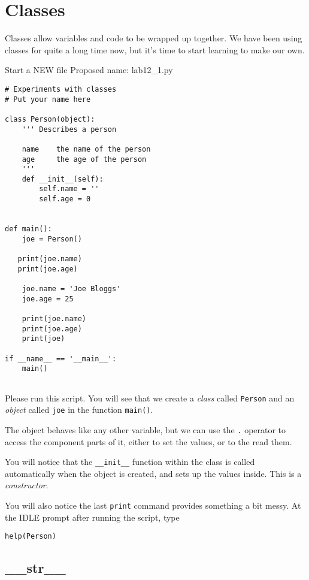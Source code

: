\documentclass[12pt,oneside]{cttutorial}
\begin{document}
\section{Classes}

Classes allow variables and code to be wrapped up together. We have been using classes for quite a long time now, but it's time to start learning to make our own.

\alert{Start a NEW file}
Proposed name: lab12\_1.py
\begin{lstlisting}
# Experiments with classes
# Put your name here

class Person(object):
    ''' Describes a person

    name    the name of the person
    age     the age of the person
    '''
    def __init__(self):
        self.name = ''
        self.age = 0


def main():
    joe = Person()

   print(joe.name)
   print(joe.age)
   
    joe.name = 'Joe Bloggs'
    joe.age = 25

    print(joe.name)
    print(joe.age)
    print(joe)

if __name__ == '__main__':
    main()
    
\end{lstlisting}

Please run this script. You will see that we create a \emph{class} called \lstinline!Person! and an \emph{object} called \lstinline!joe! in the function \lstinline!main()!.

The object behaves like any other variable, but we can use the \lstinline!.! operator to access the component parts of it, either to set the values, or to the read them.

You will notice that the \lstinline!__init__! function within the class is called automatically when the object is created, and sets up the values inside. This is a \emph{constructor}.

You will also notice the last \lstinline!print! command provides something a bit messy. At the IDLE prompt after running the script, type

\begin{lstlisting}
help(Person)
\end{lstlisting}

\subsection{\_\_str\_\_}
\end{document}

